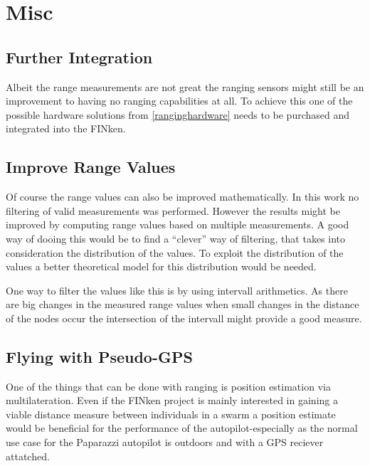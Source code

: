 \section{Misc}

\subsection{Further Integration}

Albeit the range measurements are not great the ranging sensors might still be an improvement to having no ranging capabilities at all.
To achieve this one of the possible hardware solutions from \autoref{ranginghardware} needs to be purchased and integrated into the FINken.

\subsection{Improve Range Values}

Of course the range values can also be improved mathematically.
In this work no filtering of valid measurements was performed.
However the results might be improved by computing range values based on multiple measurements.
A good way of dooing this would be to find a “clever” way of filtering, that takes into consideration the distribution of the values.
To exploit the distribution of the values a better theoretical model for this distribution would be needed.

One way to filter the values like this is by using intervall arithmetics.
As there are big changes in the measured range values when small changes in the distance of the nodes occur the intersection of the intervall might provide a good measure.




\subsection{Flying with Pseudo-GPS}
One of the things that can be done with ranging is position estimation via multilateration.
Even if the FINken project is mainly interested in gaining a viable distance measure between individuals in a swarm a position estimate would be beneficial for the performance of the autopilot-especially as the normal use case for the Paparazzi autopilot is outdoors and with a GPS reciever attatched.

